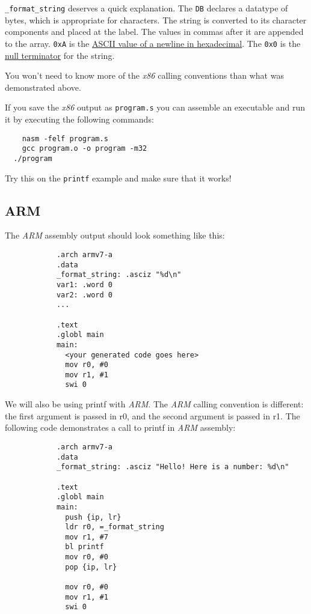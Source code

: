 \documentclass{article}
\newcommand{\code}[1]{\texttt{\textmd{#1}}}
\begin{document}
\code{\_format\_string} deserves a quick explanation. The \code{DB} declares a datatype of bytes,
which is appropriate for characters. The string is converted to its character components and
placed at the label. The values in commas after it are appended to the array. \code{0xA} is the
\href{http://www.asciitable.com/}{ASCII value of a newline in hexadecimal}. The \code{0x0} is the
\href{https://en.wikipedia.org/wiki/Null-terminated_string}{null terminator} for the string.

You won't need to know more of the \textit{x86} calling conventions than what was demonstrated
above.

If you save the \textit{x86} output as \code{program.s} you can assemble an executable and run it
by executing the following commands:
\begin{lstlisting}
	nasm -felf program.s
	gcc program.o -o program -m32
  ./program
\end{lstlisting}

Try this on the \code{printf} example and make sure that it works!

	\subsection{ARM}

		The \textit{ARM} assembly output should look something like this:

		\begin{lstlisting}
			.arch armv7-a
			.data
			_format_string: .asciz "%d\n"
			var1: .word 0
			var2: .word 0
			...

			.text
			.globl main
			main:
			  <your generated code goes here>
			  mov r0, #0
			  mov r1, #1
			  swi 0
		\end{lstlisting}

		We will also be using printf with \textit{ARM}. The \textit{ARM} calling convention is different: the first
		argument is passed in r0, and the second argument is passed in r1. The following code demonstrates a call to
		printf in \textit{ARM} assembly:

		\begin{lstlisting}
			.arch armv7-a
			.data
			_format_string: .asciz "Hello! Here is a number: %d\n"

			.text
			.globl main
			main:
			  push {ip, lr}
			  ldr r0, =_format_string
			  mov r1, #7
			  bl printf
			  mov r0, #0
			  pop {ip, lr}

			  mov r0, #0
			  mov r1, #1
			  swi 0
		\end{lstlisting}
\end{document}
